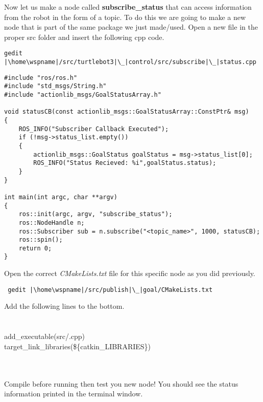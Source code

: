 \documentclass[12pt]{article}
\begin{document}
\begin{description}[labelindent=1cm]
     \newpage
\item Now let us make a node called {\bf subscribe\_status} that can access information from the robot in the form of a topic. To do this we are going to make a new node that is part of the same package we just made/used. Open a new file in the proper src folder and insert the following cpp code.
\begin{verbatim}
gedit |\home\wspname|/src/turtlebot3|\_|control/src/subscribe|\_|status.cpp 
\end{verbatim}   

         \begin{lstlisting}
#include "ros/ros.h"
#include "std_msgs/String.h"
#include "actionlib_msgs/GoalStatusArray.h"

void statusCB(const actionlib_msgs::GoalStatusArray::ConstPtr& msg)
{
    ROS_INFO("Subscriber Callback Executed");
    if (!msg->status_list.empty())
    {
        actionlib_msgs::GoalStatus goalStatus = msg->status_list[0];
        ROS_INFO("Status Recieved: %i",goalStatus.status);  
    }
}

int main(int argc, char **argv)
{
    ros::init(argc, argv, "subscribe_status");
    ros::NodeHandle n;
    ros::Subscriber sub = n.subscribe("<topic_name>", 1000, statusCB);
    ros::spin();
    return 0;
}
    \end{lstlisting}
    
    \item Open the correct {\it CMakeLists.txt} file for this specific node as you did previously.

\begin{verbatim}
 gedit |\home\wspname|/src/publish|\_|goal/CMakeLists.txt 
\end{verbatim}

Add the following lines to the bottom.\\
 \underline{\hspace{155mm}}\\\\
 {\selectfont add\_executable(\nodname\hspace{3mm}src/\nodname.cpp) } \\
{\selectfont target\_link\_libraries(\nodname \hspace{3mm}\$\{catkin\_LIBRARIES\}) } \\
\underline{\hspace{155mm}}\\\\
 
    \item Compile before running then test you new node! You should see the status information printed in the terminal window.
    
    
\end{description}    
\end{document}
